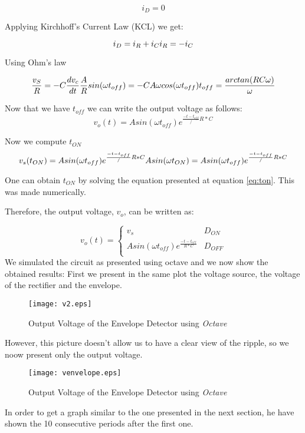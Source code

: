 \begin{equation}
  i_D=0
\end{equation}

Applying Kirchhoff's Current Law (KCL) we get:

\begin{equation}
  i_D=i_R+i_C\\
  i_R=-i_C
\end{equation}

Using Ohm's law

\begin{equation}
  \frac{v_S}{R}=-C\frac{dv_c}{dt}\\
  \frac{A}{R}sin(\omega t_{off})= - C A \omega cos(\omega t_{off}) \\
  t_{off}=\frac{arctan(RC\omega)}{\omega}
\end{equation}

Now that we have $t_{off}$ we can write the output voltage as follows:
\begin{equation}
v_o(t)=A  sin(\omega t_{off})  e^{\frac{-t-t_{off}}/{R*C}}
\end{equation}


Now we compute $t_{ON}$
\begin{equation}
	v_s(t_{ON})=A  sin(\omega t_{off})  e^{\frac{-t-t_{off}}/{R*C}}\\
	A sin(\omega t_{ON})=A  sin(\omega t_{off})  e^{\frac{-t-t_{off}}/{R*C}}
\label{eq:ton}
\end{equation}

One can obtain $t_{ON}$ by solving the equation presented at equation \ref{eq:ton}. This was made numerically.

Therefore, the output voltage, $v_o$, can be written as:

\begin{equation}
	v_o(t) = \left\{
\begin{array}{ll}
	v_s & D_{ON} \\
	A  sin(\omega t_{off})  e^{\frac{-t-t_{off}}{R*C}} & D_{OFF}\\
\end{array}
\right.
\end{equation}
We simulated the circuit as presented using octave and we now show the obtained results:
First we present in the same plot the voltage source, the voltage of the rectifier and the envelope.
\begin{figure}[H]
  \centering
  \texttt{[image: v2.eps]}
  \caption{Output Voltage of the Envelope Detector using \emph{Octave}}
  \label{fig:venvelope}
\end{figure}
However, this picture doesn't allow us to have a clear view of the ripple, so we noow present only the output voltage.
\begin{figure}[H]
  \centering
  \texttt{[image: venvelope.eps]}
  \caption{Output Voltage of the Envelope Detector using \emph{Octave}}
  \label{fig:venvelope}
\end{figure}
In order to get a graph similar to the one presented in the next section, he have shown the 10 consecutive periods after the first one.

